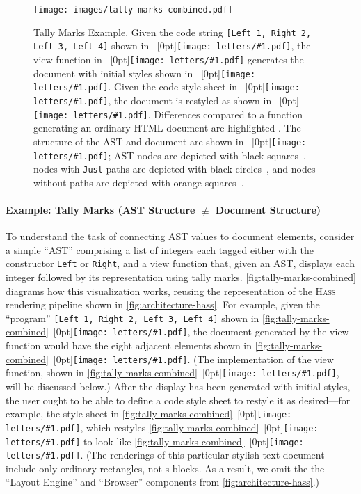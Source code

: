 \documentclass[acmsmall, screen]{acmart}
\newcommand{\parahead}[1]
  {\paragraph{\textbf{#1}}}
\newcommand{\hass}
{\textsc{Hass}}
\newcommand{\figBubble}[1]{\raisebox{-0.03in}[0pt]{\texttt{[image: letters/\#1.pdf]}}}
\newcommand{\refBubble}[1]
  {~\figBubble{#1}}
\newcommand{\refBubbleSmall}[1]
  {~\raisebox{-0.028in}[0pt]{\texttt{[image: letters/\#1.pdf]}}}
\begin{document}
\begin{figure}[b]
\texttt{[image: images/tally-marks-combined.pdf]}
\small












\caption{
Tally Marks Example.
Given the code string
\mbox{\small \texttt{[Left 1, Right 2, Left 3, Left 4]}} shown in \refBubbleSmall{a},
the view function in \refBubbleSmall{b}
generates the document with initial styles shown in \refBubbleSmall{c}.
Given the code style sheet in \refBubbleSmall{d},
the document is restyled as shown in \refBubbleSmall{e}.
Differences compared to a function generating an ordinary HTML document are highlighted .
The structure of the AST and document are shown in \refBubbleSmall{f};
AST nodes are depicted with black squares~\astNode{}, nodes with \texttt{Just} paths are depicted with black circles~\justNode{}, and nodes without paths are depicted with orange squares~\nothingNode{}.
}
\label{fig:tally-marks-combined}
\end{figure}



 
\parahead{Example: Tally Marks (AST Structure $\not\equiv$ Document Structure)}

To understand the task of connecting AST values to document elements, consider a simple ``AST'' comprising a list of integers each tagged either with the constructor \texttt{Left} or \texttt{Right},
and a view function that, given an AST, displays each integer followed by its representation using tally marks.
\autoref{fig:tally-marks-combined} diagrams how this visualization works, reusing the representation of the \hass{} rendering pipeline shown in \autoref{fig:architecture-hass}.
For example, given the ``program'' \texttt{[Left 1, Right 2, Left 3, Left 4]} shown in \autoref{fig:tally-marks-combined}\refBubble{a}, the document generated by the view function would have the eight adjacent elements shown in \autoref{fig:tally-marks-combined}\refBubble{c}.
(The implementation of the view function, shown in \autoref{fig:tally-marks-combined}\refBubble{b}, will be discussed below.)
After the display has been generated with initial styles, the user ought to be able to define a code style sheet to restyle it as desired---for example, the style sheet in \autoref{fig:tally-marks-combined}\refBubble{d}, which restyles \autoref{fig:tally-marks-combined}\refBubble{c} to look like \autoref{fig:tally-marks-combined}\refBubble{e}.
(The renderings of this particular stylish text document include only ordinary rectangles, not s-blocks. As a result, we omit the the ``Layout Engine'' and ``Browser'' components from \autoref{fig:architecture-hass}.)
\end{document}
